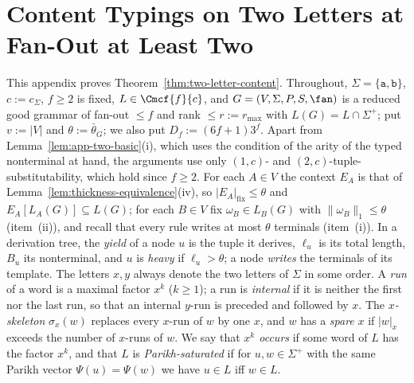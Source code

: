 \section{Content Typings on Two Letters at Fan-Out at Least Two}
\label{app:two-letter-content}

This appendix proves Theorem~\ref{thm:two-letter-content}.  Throughout,
$\Sigma=\{\mathtt a,\mathtt b\}$, $c:=c_\Sigma$, $f\ge2$ is fixed, $L\in\Cmcf{f}{c}$, and
$G=(V,\Sigma,P,S,\fan)$ is a reduced good grammar of fan-out $\le f$ and rank
$\le r:=r_{\max}$ with $L(G)=L\cap\Sigma^+$; put $v:=|V|$ and
$\theta:=\bar\theta_G$; we also put $D_f:=(6f+1)3^f$.  Apart from Lemma~\ref{lem:app-two-basic}(i), which uses the
condition of the arity of the typed nonterminal at hand, the arguments use only
$(1,c)$- and $(2,c)$-tuple-substitutability, which hold since $f\ge2$.  For each $A\in V$ the context $E_A$ is that of
Lemma~\ref{lem:thickness-equivalence}(iv), so $|E_A|_{\mathrm{fix}}\le\theta$
and $E_A[L_A(G)]\subseteq L(G)$; for each $B\in V$ fix $\omega_B\in L_B(G)$ with
$\|\omega_B\|_1\le\theta$ (item~(ii)), and recall that every rule writes at most
$\theta$ terminals (item~(i)).  In a derivation tree, the \emph{yield} of a node
$u$ is the tuple it derives, $\ell_u$ is its total length, $B_u$ its
nonterminal, and $u$ is \emph{heavy} if $\ell_u>\theta$; a node \emph{writes}
the terminals of its template.  The letters $x,y$ always denote the two
letters of $\Sigma$ in some order.  A \emph{run} of a word is a maximal factor
$x^k$ ($k\ge1$); a run is \emph{internal} if it is neither the first nor the
last run, so that an internal $y$-run is preceded and followed by $x$.  The
\emph{$x$-skeleton} $\sigma_x(w)$ replaces every $x$-run of $w$ by one $x$, and
$w$ has a \emph{spare} $x$ if $|w|_x$ exceeds the number of $x$-runs of $w$.
We say that \emph{$x^k$ occurs} if some word of $L$ has the factor $x^k$, and
that $L$ is \emph{Parikh-saturated} if for $u,w\in\Sigma^+$ with the same
Parikh vector $\Psi(u)=\Psi(w)$ we have $u\in L$ iff $w\in L$.

